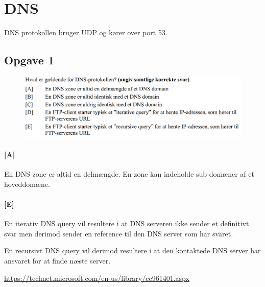 \section{DNS}
DNS protokollen bruger UDP og kører over port 53.

\subsection{Opgave 1}
\begin{figure}[H]
	\centering
	\includegraphics[width=\linewidth]{figs/dns/SE15OP2}
\end{figure}

\paragraph{[A]}
En DNS zone er altid en delmængde. En zone kan indeholde sub-domæner af et hoveddomæne.

\paragraph{[E]}
En iterativ DNS query vil resultere i at DNS serveren ikke sender et definitivt svar men derimod sender en reference til den DNS server som har svaret.

En recursivt DNS query vil derimod resultere i at den kontaktede DNS server har ansvaret for at finde næste server. 

\url{https://technet.microsoft.com/en-us/library/cc961401.aspx}